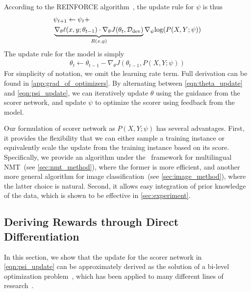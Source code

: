 According to the REINFORCE algorithm~\citep{reinforce}, the update rule for $\psi$ is thus
\begin{equation}
\label{eqn:psi_update}
\begin{aligned}
    & \psi_{t+1} \leftarrow  \psi_t + \\
    &  \underbrace{\nabla_\theta \ell(x, y; \theta_{t-1}) \cdot \nabla_\theta J(\theta_t, \mathcal{D}_\text{dev})}_{\mathclap{R(x, y)}} \nabla_\psi \text{log}(P(X, Y;\psi))
\end{aligned}
\end{equation}
The update rule for the model is simply
\begin{align}
    \label{eqn:theta_update}
    \theta_t \leftarrow \theta_{t-1} - \nabla_\theta J(\theta_{t-1}, P(X, Y;\psi))
\end{align}
For simplicity of notation, we omit the learning rate term. Full derivation can be found in \autoref{app:grad_of_optimizers}. By alternating between \autoref{eqn:theta_update} and \autoref{eqn:psi_update}, we can iteratively update $\theta$ using the guidance from the scorer network, and update $\psi$ to optimize the scorer using feedback from the model.  

Our formulation of scorer network as $P(X, Y; \psi)$ has several advantages. First, it provides the flexibility that we can either sample a training instance or equivalently scale the update from the training instance based on its score. Specifically, we provide an algorithm under the \dds~framework for multilingual NMT~(see \autoref{sec:nmt_method}), where the former is more efficient, and another more general algorithm for image classification~(see \autoref{sec:image_method}), where the latter choice is natural. Second, it allows easy integration of prior knowledge of the data, which is shown to be effective in \autoref{sec:experiment}. 

\subsection{\label{sec:diff_data_selection}Deriving Rewards through Direct Differentiation}
In this section, we show that the update for the scorer network in \autoref{eqn:psi_update} can be approximately derived as the solution of a bi-level optimization problem~\citep{bilevel_optim}, which has been applied to many different lines of research~\citep{hyper_grad,darts,learn_reweight}. 

